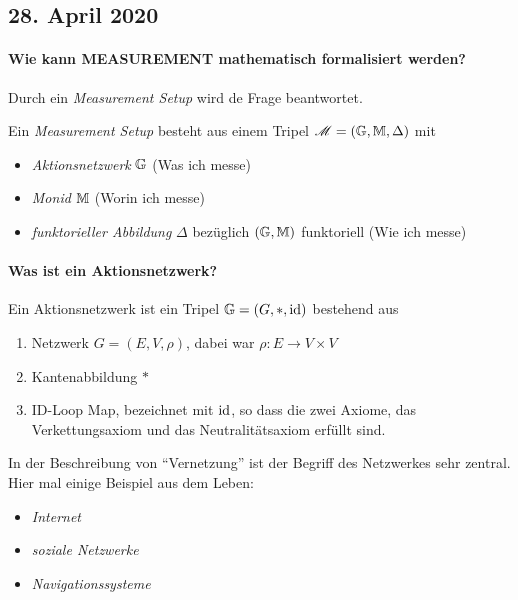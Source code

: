 \subsection*{28. April 2020}
\paragraph{Wie kann MEASUREMENT mathematisch formalisiert werden?}
Durch ein \emph{Measurement Setup} wird de Frage beantwortet.
\begin{definition}
    Ein \emph{Measurement Setup} besteht aus einem Tripel $\operatorname{\mathscr M} = (\mathbb{G}, \mathbb{M}, \Delta)$ mit 
    \begin{itemize}
        \item \emph{Aktionsnetzwerk} $\mathbb{G}$ (Was ich messe)
        \item \emph{Monid} $\mathbb{M}$ (Worin ich messe)
        \item \emph{funktorieller Abbildung} $\Delta$ bezüglich $(\mathbb{G},\mathbb{M})$ funktoriell (Wie ich messe)
    \end{itemize}
\end{definition}
\paragraph{Was ist ein Aktionsnetzwerk?}
\begin{definition}
    Ein Aktionsnetzwerk ist ein Tripel $\mathbb{G} = (G,\ast, \operatorname{id})$ bestehend aus
    \begin{enumerate}
        \item Netzwerk $G = (E,V,\rho)$, dabei war $\rho \colon E \to V \times V$
        \item Kantenabbildung $\ast$
        \item ID-Loop Map, bezeichnet mit $\operatorname{id}$, so dass die zwei Axiome, das Verkettungsaxiom und das Neutralitätsaxiom erfüllt sind.
    \end{enumerate}
\end{definition}
\begin{example}
    In der Beschreibung von ``Vernetzung'' ist der Begriff des Netzwerkes sehr zentral. Hier mal einige Beispiel aus dem Leben:
    \begin{itemize}
        \item \emph{Internet}
        \item \emph{soziale Netzwerke}
        \item \emph{Navigationssysteme}
    \end{itemize}
\end{example}
